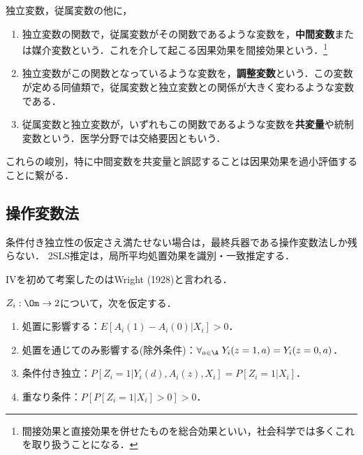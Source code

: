 \documentclass[uplatex,dvipdfmx]{jsreport}
\begin{document}
\begin{definition}
    独立変数，従属変数の他に，
    \begin{enumerate}
        \item 独立変数の関数で，従属変数がその関数であるような変数を，\textbf{中間変数}または媒介変数という．これを介して起こる因果効果を間接効果という．\footnote{間接効果と直接効果を併せたものを総合効果といい，社会科学では多くこれを取り扱うことになる．}
        \item 独立変数がこの関数となっているような変数を，\textbf{調整変数}という．この変数が定める同値類で，従属変数と独立変数との関係が大きく変わるような変数である．
        \item 従属変数と独立変数が，いずれもこの関数であるような変数を\textbf{共変量}や統制変数という．医学分野では交絡要因ともいう．
    \end{enumerate}
\end{definition}
\begin{remark}
    これらの峻別，特に中間変数を共変量と誤認することは因果効果を過小評価することに繋がる．
\end{remark}

\subsection{操作変数法}

\begin{tcolorbox}[colframe=ForestGreen, colback=ForestGreen!10!white,breakable,colbacktitle=ForestGreen!40!white,coltitle=black,fonttitle=\bfseries\sffamily,
title=]
    条件付き独立性の仮定さえ満たせない場合は，最終兵器である操作変数法しか残らない．
    2SLS推定は，局所平均処置効果を識別・一致推定する．
\end{tcolorbox}

\begin{history}
    IVを初めて考案したのはWright (1928)と言われる．
\end{history}

\begin{model}
    $Z_i:\Om\to2$について，次を仮定する．
    \begin{enumerate}
        \item 処置に影響する：$E[A_i(1)-A_i(0)|X_i]>0$．
        \item 処置を通じてのみ影響する(除外条件)：$\forall_{a\in\A}\;Y_i(z=1,a)=Y_i(z=0,a)$．
        \item 条件付き独立：$P[Z_i=1|Y_i(d),A_i(z),X_i]=P[Z_i=1|X_i]$．
        \item 重なり条件：$P[P[Z_i=1|X_i]>0]>0$．
    \end{enumerate}
\end{model}
\end{document}
